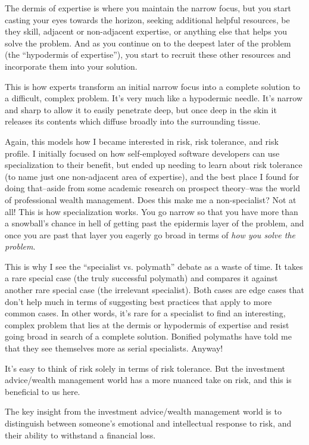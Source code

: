 The dermis of expertise is where you maintain the narrow focus, but you start casting your eyes towards the horizon, seeking additional helpful resources, be they skill, adjacent or non-adjacent expertise, or anything else that helps you solve the problem. And as you continue on to the deepest later of the problem (the ``hypodermis of expertise''), you start to recruit these other resources and incorporate them into your solution.

This is how experts transform an initial narrow focus into a complete solution to a difficult, complex problem. It's very much like a hypodermic needle. It's narrow and sharp to allow it to easily penetrate deep, but once deep in the skin it releases its contents which diffuse broadly into the surrounding tissue.

Again, this models how I became interested in risk, risk tolerance, and risk profile. I initially focused on how self-employed software developers can use specialization to their benefit, but ended up needing to learn about risk tolerance (to name just one non-adjacent area of expertise), and the best place I found for doing that--aside from some academic research on prospect theory--was the world of professional wealth management. Does this make me a non-specialist? Not at all! This is how specialization works. You go narrow so that you have more than a snowball's chance in hell of getting past the epidermis layer of the problem, and once you are past that layer you eagerly go broad in terms of \emph{how you solve the problem}.

This is why I see the ``specialist vs. polymath'' debate as a waste of time. It takes a rare special case (the truly successful polymath) and compares it against another rare special case (the irrelevant specialist). Both cases are edge cases that don't help much in terms of suggesting best practices that apply to more common cases. In other words, it's rare for a specialist to find an interesting, complex problem that lies at the dermis or hypodermis of expertise and resist going broad in search of a complete solution. Bonified polymaths have told me that they see themselves more as serial specialists. Anyway!

It's easy to think of risk solely in terms of risk tolerance. But the investment advice/wealth management world has a more nuanced take on risk, and this is beneficial to us here.

The key insight from the investment advice/wealth management world is to distinguish between someone's emotional and intellectual response to risk, and their ability to withstand a financial loss.

